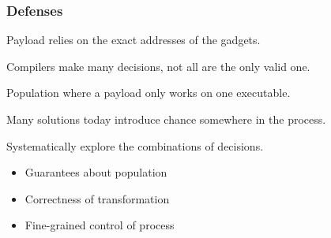 \begin{frame}
	\frametitle{Defenses}

	Payload relies on the exact addresses of the gadgets.

	\vspace{0.5cm}

	Compilers make many decisions, not all are the only valid one.

	\vspace{0.5cm}

	Population where a payload only works on one executable.

	\vspace{0.5cm}

	Many solutions today introduce chance somewhere in the process.

	\vspace{0.5cm}

	Systematically explore the combinations of decisions.

	\begin{itemize}
		\item Guarantees about population
		\item Correctness of transformation
		\item Fine-grained control of process
	\end{itemize}

\end{frame}
